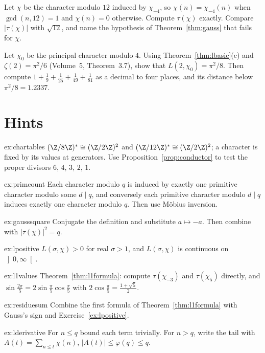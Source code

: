 \begin{exercise}[$\star\star$]\label{ex:gauss12}
Let $\chi$ be the character modulo $12$ induced by $\chi_{-4}$, so $\chi(n)=\chi_{-4}(n)$ when $\gcd(n,12)=1$ and $\chi(n)=0$ otherwise. Compute $\tau(\chi)$ exactly. Compare $|\tau(\chi)|$ with $\sqrt{12}$, and name the hypothesis of Theorem~\ref{thm:gauss} that fails for $\chi$.
\end{exercise}

\begin{exercise}[$\star\star\star$]\label{ex:l2mod4}
Let $\chi_0$ be the principal character modulo $4$. Using Theorem~\ref{thm:lbasic}(c) and $\zeta(2)=\pi^2/6$ (Volume~5, Theorem~3.7), show that $L(2,\chi_0)=\pi^2/8$. Then compute $1+\frac19+\frac1{25}+\frac1{49}+\frac1{81}$ as a decimal to four places, and its distance below $\pi^2/8=1.2337$.
\end{exercise}

\section{Hints}

\begin{hint}{ex:chartables}
$(\Z/8\Z)^*\cong(\Z/2\Z)^2$ and $(\Z/12\Z)^*\cong(\Z/2\Z)^2$; a character is fixed by its values at generators. Use Proposition~\ref{prop:conductor} to test
the proper divisors $6$, $4$, $3$, $2$, $1$.
\end{hint}
\begin{hint}{ex:primcount}
Each character modulo $q$ is induced by exactly one primitive character modulo some $d\mid q$, and conversely each primitive character
modulo $d\mid q$ induces exactly one character modulo $q$. Then use Möbius inversion.
\end{hint}
\begin{hint}{ex:gausssquare}
Conjugate the definition and substitute $a\mapsto-a$. Then combine with $|\tau(\chi)|^2=q$.
\end{hint}
\begin{hint}{ex:lpositive}
$L(\sigma,\chi)>0$ for real $\sigma>1$, and $L(\sigma,\chi)$ is continuous on $\left]0,\infty\right[$.
\end{hint}
\begin{hint}{ex:l1values}
Theorem~\ref{thm:l1formula}: compute $\tau(\chi_{-3})$ and $\tau(\chi_5)$ directly, and $\sin\frac{2\pi}5=2\sin\frac\pi5\cos\frac\pi5$ with $2\cos\frac\pi5=\frac{1+\sqrt5}2$.
\end{hint}
\begin{hint}{ex:residuesum}
Combine the first formula of Theorem~\ref{thm:l1formula} with Gauss's sign and Exercise~\ref{ex:lpositive}.
\end{hint}
\begin{hint}{ex:lderivative}
For $n\le q$ bound each term trivially. For $n>q$, write the tail with $A(t)=\sum_{n\le t}\chi(n)$, $|A(t)|\le\varphi(q)\le q$.
\end{hint}

